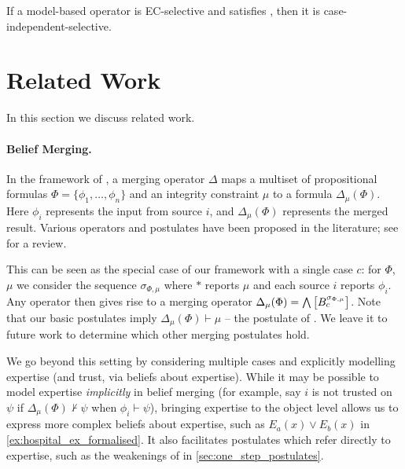 \begin{corollary}
    \label{cor:ec_selective_ci}
    If a model-based operator is EC-selective and satisfies \soundness{}, then
    it is case-independent-selective.
\end{corollary}

\section{Related Work}
\label{sec:relatedwork}

In this section we discuss related work.

\paragraph{Belief Merging.}

In the framework of \textcite{konieczny2002merging}, a merging operator $\Delta$
maps a multiset of propositional formulas $\Phi = \{\phi_1,\ldots,\phi_n\}$ and
an integrity constraint $\mu$ to a formula $\Delta_\mu(\Phi)$. Here $\phi_i$
represents the input from source $i$, and $\Delta_\mu(\Phi)$ represents the
merged result. Various operators and postulates have been proposed in the
literature; see \cite{Konieczny_2011} for a review.

This can be seen as the special case of our framework with a single case $c$:
for $\Phi$, $\mu$ we consider the sequence $\sigma_{\Phi, \mu}$ where $\ast$
reports $\mu$ and each source $i$ reports $\phi_i$. Any operator then gives
rise to a merging operator $\Delta_\mu(\Phi) =
\bigwedge\left[{B^{\sigma_{\Phi,\mu}}_c}\right]$. Note that our basic postulates
imply $\Delta_\mu(\Phi) \vdash \mu$ -- the  postulate of
\textcite{konieczny2002merging}. We leave it to future work to determine which
other merging postulates hold.

We go beyond this setting by considering multiple cases and explicitly
modelling expertise (and trust, via beliefs about expertise). While it may be
possible to model expertise \emph{implicitly} in belief merging (for example,
say $i$ is not trusted on $\psi$ if $\Delta_\mu(\Phi) \not\vdash \psi$ when
$\phi_i \vdash \psi$), bringing expertise to the object level allows us to
express more complex beliefs about expertise, such as $E_a(x) \lor E_b(x)$ in
\cref{ex:hospital_ex_formalised}. It also facilitates postulates which refer
directly to expertise, such as the weakenings of  in
\cref{sec:one_step_postulates}.

